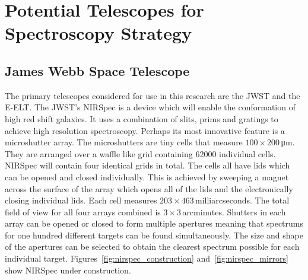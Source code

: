 	\newpage
\section{Potential Telescopes for Spectroscopy Strategy} %
	\label{sub:candidate_telescopes}
		\subsection{James Webb Space Telescope} %
		\label{ssub:james_webb_space_telescope}
			The primary telescopes considered for use in this research are the JWST and the E-ELT. The JWST's NIRSpec is a device which will enable the conformation of high red shift galaxies. It uses a combination of slits, prims and gratings to achieve high resolution spectroscopy. Perhaps its most innovative feature is a microshutter array. The microshutters are tiny cells that measure $100 \times 200$\,\si{\micro\metre}. They are arranged over a waffle like grid containing \num{62000} individual cells. NIRSpec will contain four identical grids in total. The cells all have lids which can be opened and closed individually. This is achieved by sweeping a magnet across the surface of the array which opens all of the lids and the electronically closing individual lids. Each cell measures $203 \times 463$\,milliarcseconds. The total field of view for all four arrays combined is $3 \times 3$\,arcminutes. Shutters in each array can be opened or closed to form multiple apertures meaning that spectrums for one hundred different targets can be found simultaneously. The size and shape of the apertures can be selected to obtain the clearest spectrum possible for each individual target. Figures~\ref{fig:nirspec_construction} and~\ref{fig:nirspec_mirrors} show NIRSpec under construction\cite{NIRSpec}\cite{JWSTinformation}.

